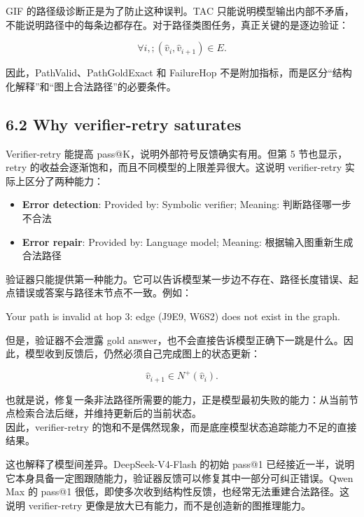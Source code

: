 \documentclass[
  11pt,
]{article}
\newenvironment{Shaded}{}{}
\newcommand{\NormalTok}[1]{#1}
\providecommand{\tightlist}{%
  \setlength{\itemsep}{0pt}\setlength{\parskip}{0pt}}
\begin{document}
GIF 的路径级诊断正是为了防止这种误判。TAC
只能说明模型输出内部不矛盾，不能说明路径中的每条边都存在。对于路径类图任务，真正关键的是逐边验证：

\[
\forall i,;(\hat{v}_i,\hat{v}_{i+1})\in E.  
\]

因此，PathValid、PathGoldExact 和 FailureHop
不是附加指标，而是区分``结构化解释''和``图上合法路径''的必要条件。

\subsection{6.2 Why verifier-retry
saturates}\label{why-verifier-retry-saturates}

Verifier-retry 能提高 pass@K，说明外部符号反馈确实有用。但第 5
节也显示，retry 的收益会逐渐饱和，而且不同模型的上限差异很大。这说明
verifier-retry 实际上区分了两种能力：

\begin{itemize}
\tightlist
\item
  \textbf{Error detection}: Provided by: Symbolic verifier; Meaning:
  判断路径哪一步不合法
\item
  \textbf{Error repair}: Provided by: Language model; Meaning:
  根据输入图重新生成合法路径
\end{itemize}

验证器只能提供第一种能力。它可以告诉模型某一步边不存在、路径长度错误、起点错误或答案与路径末节点不一致。例如：

\begin{Shaded}
\begin{Highlighting}[]
\NormalTok{Your path is invalid at hop 3:}
\NormalTok{edge (J9E9, W6S2) does not exist in the graph.}
\end{Highlighting}
\end{Shaded}

但是，验证器不会泄露 gold
answer，也不会直接告诉模型正确下一跳是什么。因此，模型收到反馈后，仍然必须自己完成图上的状态更新：

\[
\hat{v}_{i+1}\in N^+(\hat{v}_i).  
\]

也就是说，修复一条非法路径所需要的能力，正是模型最初失败的能力：从当前节点检索合法后继，并维持更新后的当前状态。\\
因此，verifier-retry
的饱和不是偶然现象，而是底座模型状态追踪能力不足的直接结果。

这也解释了模型间差异。DeepSeek-V4-Flash 的初始 pass@1
已经接近一半，说明它本身具备一定图跟随能力，验证器反馈可以修复其中一部分可纠正错误。Qwen
Max 的 pass@1
很低，即使多次收到结构性反馈，也经常无法重建合法路径。这说明
verifier-retry 更像是放大已有能力，而不是创造新的图推理能力。
\end{document}
